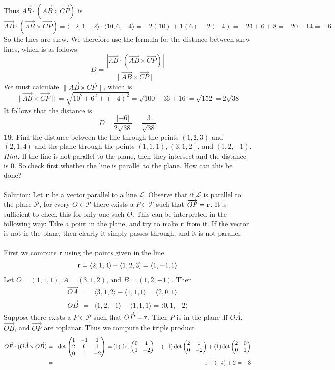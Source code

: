 \documentclass[12pt]{amsbook}
\newcommand{\la}{\langle}
\newcommand{\ra}{\rangle}
\begin{document}
Thus $\overrightarrow{AB}\cdot(\overrightarrow{AB}\times\overrightarrow{CP})$ is 
$$\overrightarrow{AB}\cdot(\overrightarrow{AB}\times\overrightarrow{CP})=\la -2,1,-2 \ra\cdot \la 10,6,-4 \ra=-2(10)+1(6)-2(-4)=-20+6+8=-20+14=-6$$
So the lines are skew. We therefore use the formula for the distance between skew lines, which is as follows:
$$D=\frac{|\overrightarrow{AB}\cdot(\overrightarrow{AB}\times\overrightarrow{CP})|}{\|\overrightarrow{AB}\times\overrightarrow{CP}\|}$$
We must calculate $\|\overrightarrow{AB}\times\overrightarrow{CP}\|$, which is 
$$\|\overrightarrow{AB}\times\overrightarrow{CP}\|=\sqrt{10^2+6^2+(-4)^2}=\sqrt{100+36+16}=\sqrt{152}=2\sqrt{38}$$
It follows that the distance is
$$D=\frac{|-6|}{2\sqrt{38}}=\frac{3}{\sqrt{38}}$$
{\small\bf 19}. Find the distance between the line through the points
$(1,2,3)$ and $(2,1,4)$ and the plane through the points
$(1,1,1)$, $(3,1,2)$, and $(1,2,-1)$. {\it Hint:} If the line is
not parallel to the plane, then they intersect and the distance is
0. So check first whether the line is parallel to the plane. How
can this be done?\\
\\
{\sc Solution}: Let $\bf r$ be a vector parallel to a line $\mathcal{L}$. Observe that if $\mathcal{L}$ is parallel to the plane $\mathcal{P}$, for every $O\in\mathcal{P}$ there exists a $P \in \mathcal{P}$ such that $\overrightarrow{OP}=\bf r$. It is sufficient to check this for only one such $O$. This can be interpreted in the following way: Take a point in the plane, and try to make $\bf r$ from it. If the vector is not in the plane, then clearly it simply passes through, and it is not parallel. \\
\\
First we compute $\bf r$ using the points given in the line
$${\bf r}=\la 2,1,4 \ra - \la 1,2,3 \ra = \la 1,-1,1 \ra $$
Let $O=(1,1,1)$, $A=(3,1,2)$, and $B=(1,2,-1)$. Then
\begin{eqnarray*}
\overrightarrow{OA}&=&\la 3,1,2 \ra - \la 1,1,1 \ra = \la 2,0,1 \ra \\ 
\overrightarrow{OB}&=&\la 1,2,-1 \ra - \la 1,1,1 \ra = \la 0,1,-2 \ra  
\end{eqnarray*} 
Suppose there exists a $P\in\mathcal{P}$ such that $\overrightarrow{OP}=\bf r$. Then $P$ is in the plane iff $\overrightarrow{OA}$, $\overrightarrow{OB}$, and $\overrightarrow{OP}$ are coplanar. Thus we compute the triple product
\begin{eqnarray*}
\overrightarrow{OP}\cdot(\overrightarrow{OA}\times\overrightarrow{OB})&=&\det\begin{pmatrix}
1&-1&1 \cr 2&0&1 \cr 0&1&-2
\end{pmatrix}=(1)\det\begin{pmatrix} 0&1 \cr 1&-2 \end{pmatrix}-(-1)\det\begin{pmatrix} 2&1 \cr 0&-2 \end{pmatrix}+(1)\det\begin{pmatrix} 2&0 \cr 0&1 \end{pmatrix}\\
&=&-1+(-4)+2=-3
\end{eqnarray*}
\end{document}
